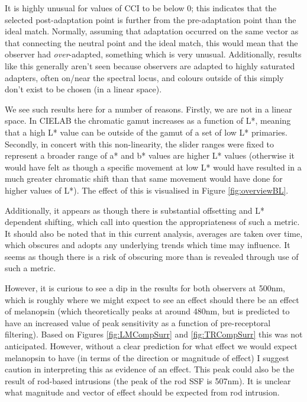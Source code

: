 It is highly unusual for values of \gls{CCI} to be below 0; this indicates that the selected post-adaptation point is further from the pre-adaptation point than the ideal match. Normally, assuming that adaptation occurred on the same vector as that connecting the neutral point and the ideal match, this would mean that the observer had \emph{over}-adapted, something which is very unusual. Additionally, results like this generally aren't seen because observers are adapted to highly saturated adapters, often on/near the spectral locus, and colours outside of this simply don't exist to be chosen (in a linear space). 

We see such results here for a number of reasons. Firstly, we are not in a linear space. In CIELAB the chromatic gamut increases as a function of L*, meaning that a high L* value can be outside of the gamut of a set of low L* primaries. Secondly, in concert with this non-linearity, the slider ranges were fixed to represent a broader range of a* and b* values are higher L* values (otherwise it would have felt as though a specific movement at low L* would have resulted in a much greater chromatic shift than that same movement would have done for higher values of L*). The effect of this is visualised in Figure \ref{fig:overviewBL}.

Additionally, it appears as though there is substantial offsetting and L* dependent shifting, which call into question the appropriateness of such a metric. It should also be noted that in this current analysis, averages are taken over time, which obscures and adopts any underlying trends which time may influence. It seems as though there is a risk of obscuring more than is revealed through use of such a metric.

However, it is curious to see a dip in the results for both observers at 500nm, which is roughly where we might expect to see an effect should there be an effect of melanopsin (which theoretically peaks at around 480nm, but is predicted to have an increased value of peak sensitivity as a function of pre-receptoral filtering). Based on Figures \ref{fig:LMCompSurr} and \ref{fig:TRCompSurr} this was not anticipated. However, without a clear prediction for what effect we would expect melanopsin to have (in terms of the direction or magnitude of effect) I suggest caution in interpreting this as evidence of an effect. This peak could also be the result of rod-based intrusions (the peak of the rod \gls{SSF} is 507nm). It is unclear what magnitude and vector of effect should be expected from rod intrusion.

